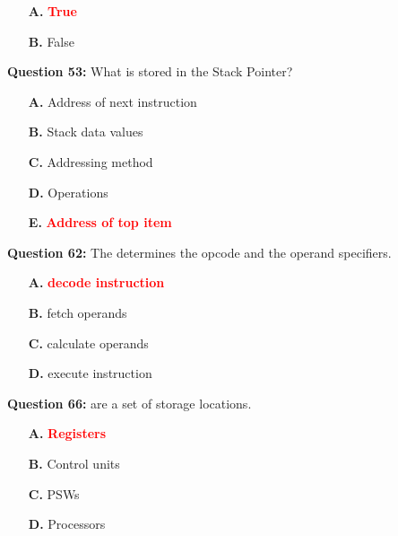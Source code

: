\documentclass[12pt,a4paper]{article}
\begin{document}
\begin{itemize}
    \item[\textbf{A.}] \textcolor{red}{\textbf{True}}
    \item[\textbf{B.}] False
\end{itemize}

\vspace{0.5cm}

\vspace{0.5cm}

\textbf{Question 53:} What is stored in the Stack Pointer?

\begin{itemize}
    \item[\textbf{A.}] Address of next instruction
    \item[\textbf{B.}] Stack data values
    \item[\textbf{C.}] Addressing method
    \item[\textbf{D.}] Operations
    \item[\textbf{E.}] \textcolor{red}{\textbf{Address of top item}}
\end{itemize}

\vspace{0.5cm}

\vspace{0.5cm}

\textbf{Question 62:} The \underline{\hspace{1.5cm}} determines the opcode and the operand specifiers.

\begin{itemize}
    \item[\textbf{A.}] \textcolor{red}{\textbf{decode instruction}}
    \item[\textbf{B.}] fetch operands
    \item[\textbf{C.}] calculate operands
    \item[\textbf{D.}] execute instruction
\end{itemize}

\vspace{0.5cm}

\vspace{0.5cm}

\textbf{Question 66:} \underline{\hspace{1.5cm}} are a set of storage locations.

\begin{itemize}
    \item[\textbf{A.}] \textcolor{red}{\textbf{Registers}}
    \item[\textbf{B.}] Control units
    \item[\textbf{C.}] PSWs
    \item[\textbf{D.}] Processors
\end{itemize}
\end{document}
